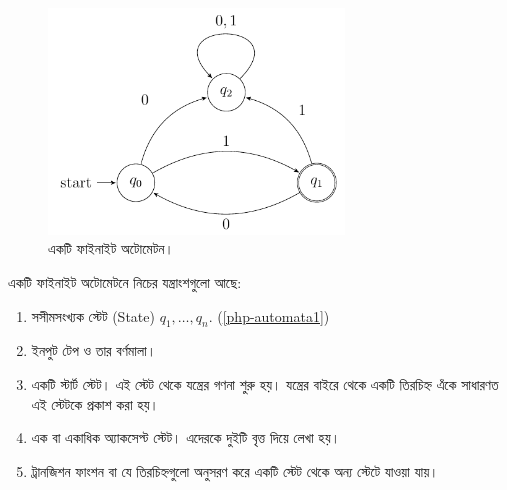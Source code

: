 \begin{figure}[hbt]
	\centering
	\includegraphics[height=6cm]{img/pigeonhole_principle/101}
	\caption{একটি ফাইনাইট অটোমেটন।}
	\label{php-automata1}
\end{figure}

একটি ফাইনাইট অটোমেটনে নিচের যন্ত্রাংশগুলো আছে: 
\begin{enumerate}
	\item সসীমসংখ্যক স্টেট (State) $q_1,\ldots,q_n$. (\autoref{php-automata1})
	\item ইনপুট টেপ ও তার বর্ণমালা। 
	\item একটি স্টার্ট স্টেট। এই স্টেট থেকে যন্ত্রের গণনা শুরু হয়। যন্ত্রের বাইরে থেকে একটি তিরচিহ্ন এঁকে সাধারণত এই স্টেটকে প্রকাশ করা হয়।
	\item এক বা একাধিক অ্যাকসেপ্ট স্টেট। এদেরকে দুইটি বৃত্ত দিয়ে লেখা হয়।
	\item ট্রানজিশন ফাংশন বা যে তিরচিহ্নগুলো অনুসরণ করে একটি স্টেট থেকে অন্য স্টেটে যাওয়া যায়।
\end{enumerate}


